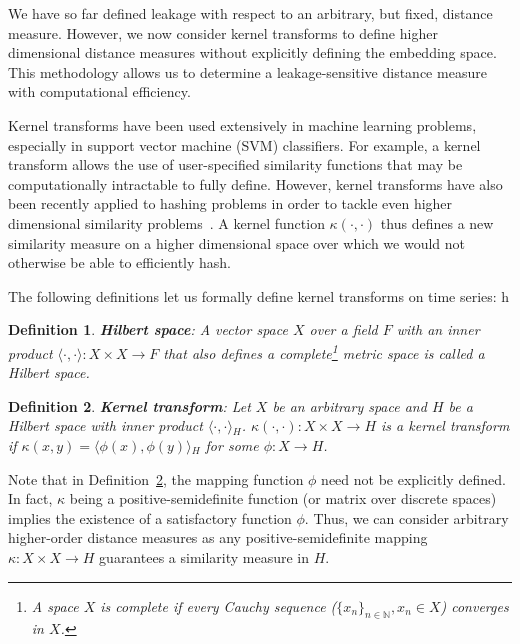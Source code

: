\documentclass[a4paper]{article}
\newcommand{\innerproduct}[2]{\langle{}#1,#2\rangle{}}
\newtheorem{definition}{Definition}
\begin{document}
We have so far defined leakage with respect to an arbitrary, but fixed, distance measure.
However, we now consider kernel transforms to define higher dimensional distance measures without explicitly defining the embedding space.
This methodology allows us to determine a leakage-sensitive distance measure with computational efficiency.

Kernel transforms have been used extensively in machine learning problems, especially in support vector machine (SVM) classifiers. 
For example, a kernel transform allows the use of user-specified similarity functions that may be computationally intractable to fully define.
However, kernel transforms have also been recently applied to hashing problems in order to tackle even higher dimensional similarity problems~\cite{Kulis12-KLSH, Kale14-KLSH, Jiang15-KLSH}.
A kernel function $\kappa(\cdot,\cdot)$ thus defines a new similarity measure on a higher dimensional space over which we would not otherwise be able to efficiently hash.

The following definitions let us formally define kernel transforms on time series:
h
\begin{definition}\label{defn:hilbert_space}
    \textbf{Hilbert space}:
    A vector space $X$ over a field $F$ with an inner product $\innerproduct{\cdot}{\cdot}: X \times X \rightarrow F$ that also defines a complete\footnote{A space $X$ is complete if every Cauchy sequence ($\{x_n\}_{n \in \mathbb{N}}, x_n \in X$) converges in $X$.} metric space is called a Hilbert space.
\end{definition}

\begin{definition}\label{defn:kernel_trick}
    \textbf{Kernel transform}:
    Let $X$ be an arbitrary space and $H$ be a Hilbert space with inner product $\innerproduct{\cdot}{\cdot}_H$.
    $\kappa(\cdot, \cdot): X \times X \rightarrow H$ is a kernel transform if $\kappa(x,y) = \innerproduct{\phi(x)}{\phi(y)}_H$ for some $\phi: X \rightarrow H$.
\end{definition}

Note that in Definition~\ref{defn:kernel_trick}, the mapping function $\phi$ need not be explicitly defined.
In fact, $\kappa$ being a positive-semidefinite function (or matrix over discrete spaces) implies the existence of a satisfactory function $\phi$.
Thus, we can consider arbitrary higher-order distance measures as any positive-semidefinite mapping $\kappa: X \times X \rightarrow H$ guarantees a similarity measure in $H$.
\end{document}
